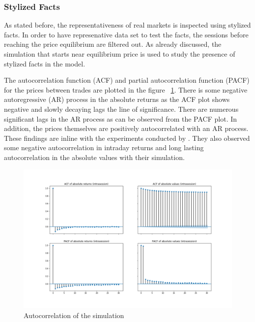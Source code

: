 \subsubsection{Stylized Facts}
As stated before, the representativeness of real markets is inspected using
stylized facts. In order to have represenative data set to test the facts, the
sessions before reaching the price equilibrium are filtered out. 
As already discussed, the simulation that starts near equilibrium price
is used to study the presence of stylized facts in the model. 

The autocorrelation function (ACF) and partial autocorrelation function (PACF) for the prices between
trades are plotted in the figure ~\ref{fig:basic_autocorr}. There is some negative autoregressive
(AR) process in the absolute returns as the ACF plot shows negative and slowly decaying lags 
the line of significance. There are numerous significant lags in the AR process as can be observed from 
the PACF plot. In addition, the prices themselves are positively autocorrelated with an AR process.
These findings are inline with the experiments conducted by \citet{Raberto05}. They also observed
some negative autocorrelation in intraday returns and long lasting autocorrelation in the absolute
values with their simulation.


\begin{figure}
    \includegraphics[width=\linewidth]{plots/basic_autocorrelation_intra.png}
    \caption{Autocorrelation of the simulation}
    \label{fig:basic_autocorr}
\end{figure}

